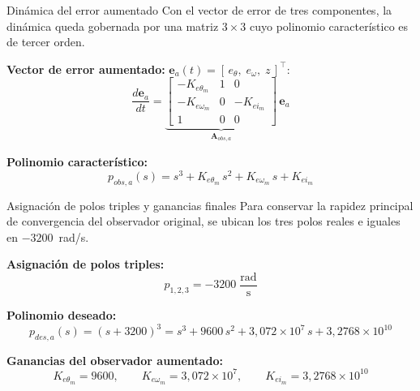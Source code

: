 \documentclass[aspectratio=169,t]{beamer}
\begin{document}
\begin{frame}{Dinámica del error aumentado}
{\small\color{uncGray}Con el vector de error de tres componentes, la dinámica queda gobernada por una matriz $3\times 3$ cuyo polinomio característico es de tercer orden.}\par
\vspace{3mm}

\textbf{Vector de error aumentado:} $\bm{e}_a(t) = [\,e_\theta,\;e_\omega,\;z\,]^\top$:
\begin{equation*}
\frac{d\bm{e}_a}{dt} = \underbrace{\begin{bmatrix}
-K_{e\theta_m} & 1 & 0 \\
-K_{e\omega_m} & 0 & -K_{ei_m} \\
1 & 0 & 0
\end{bmatrix}}_{\bm{A}_{obs,a}}\,\bm{e}_a
\end{equation*}

\textbf{Polinomio característico:}
\begin{equation*}
p_{obs,a}(s) = s^{3} + K_{e\theta_m}\,s^{2} + K_{e\omega_m}\,s + K_{ei_m}
\end{equation*}
\end{frame}

\begin{frame}{Asignación de polos triples y ganancias finales}
{\small\color{uncGray}Para conservar la rapidez principal de convergencia del observador original, se ubican los tres polos reales e iguales en $-3200$~rad/s.}\par
\vspace{3mm}

\textbf{Asignación de polos triples:}
\begin{equation*}
p_{1,2,3} = -3200\;\frac{\text{rad}}{\text{s}}
\end{equation*}

\textbf{Polinomio deseado:}
\begin{equation*}
p_{des,a}(s) = (s + 3200)^{3} = s^{3} + 9600\,s^{2} + 3{,}072\!\times\!10^{7}\,s + 3{,}2768\!\times\!10^{10}
\end{equation*}

\textbf{Ganancias del observador aumentado:}
\begin{equation*}
\boxed{\;
K_{e\theta_m} = 9600,
\qquad
K_{e\omega_m} = 3{,}072\!\times\!10^{7},
\qquad
K_{ei_m} = 3{,}2768\!\times\!10^{10}
\;}
\end{equation*}
\end{frame}
\end{document}
